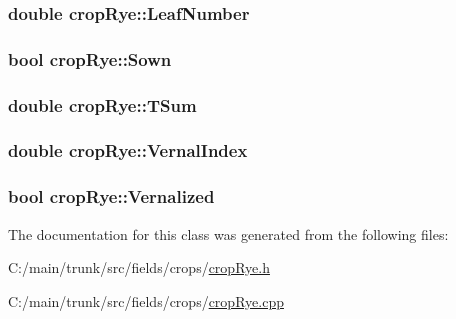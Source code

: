 \label{classcrop_rye_a8fee56d92137c695ffbce9820d38eb9c}
\hypertarget{classcrop_rye_a4907c9d07c45b91e95bbfeea1838bcc3}{
\subsubsection[{LeafNumber}]{\setlength{\rightskip}{0pt plus 5cm}double {\bf cropRye::LeafNumber}}}
\label{classcrop_rye_a4907c9d07c45b91e95bbfeea1838bcc3}
\hypertarget{classcrop_rye_a3d5c385e415eb60ca33b00bafe5b3ce0}{
\subsubsection[{Sown}]{\setlength{\rightskip}{0pt plus 5cm}bool {\bf cropRye::Sown}}}
\label{classcrop_rye_a3d5c385e415eb60ca33b00bafe5b3ce0}
\hypertarget{classcrop_rye_a2de0cde8d4ef4ff9721e57aa6fa016ae}{
\subsubsection[{TSum}]{\setlength{\rightskip}{0pt plus 5cm}double {\bf cropRye::TSum}}}
\label{classcrop_rye_a2de0cde8d4ef4ff9721e57aa6fa016ae}
\hypertarget{classcrop_rye_a955145aa7baf3c94b732e46fcee08de0}{
\subsubsection[{VernalIndex}]{\setlength{\rightskip}{0pt plus 5cm}double {\bf cropRye::VernalIndex}}}
\label{classcrop_rye_a955145aa7baf3c94b732e46fcee08de0}
\hypertarget{classcrop_rye_adf7f306b8c8ba27f5b9b10ba9648997e}{
\subsubsection[{Vernalized}]{\setlength{\rightskip}{0pt plus 5cm}bool {\bf cropRye::Vernalized}}}
\label{classcrop_rye_adf7f306b8c8ba27f5b9b10ba9648997e}


The documentation for this class was generated from the following files:\begin{DoxyCompactItemize}
\item 
C:/main/trunk/src/fields/crops/\hyperlink{crop_rye_8h}{cropRye.h}\item 
C:/main/trunk/src/fields/crops/\hyperlink{crop_rye_8cpp}{cropRye.cpp}\end{DoxyCompactItemize}
